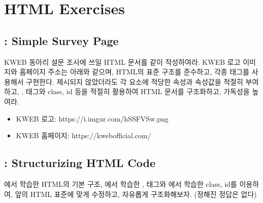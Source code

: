 \section{HTML Exercises}\label{sect:html-exercises}

\subsection*{: Simple Survey Page}

KWEB 동아리 설문 조사에 쓰일 HTML 문서를 \와 같이 작성하여라. KWEB 로고 이미지와 홈페이지 주소는 아래와 같으며, HTML의 표준 구조를 준수하고, 각종 태그를 사용해서 구현한다. 제시되지 않았더라도 각 요소에 적당한 속성과 속성값을 적절히 부여하고, ,  태그와 class, id 등을 적절히 활용하여 HTML 문서를 구조화하고, 가독성을 높여라.

\begin{itemize}
    \item KWEB 로고: https://i.imgur.com/hSSFVSw.png
    \item KWEB 홈페이지: https://kwebofficial.com/
\end{itemize}

    {}

\subsection*{: Structurizing HTML Code}

에서 학습한 HTML의 기본 구조, 에서 학습한 ,  태그와 에서 학습한 class, id를 이용하여, 앞의 \를 HTML 표준에 맞게 수정하고, 자유롭게 구조화해보자. (정해진 정답은 없다)
